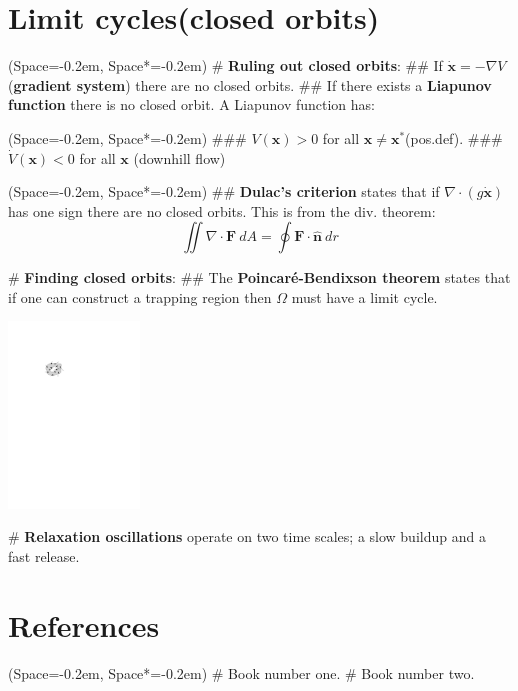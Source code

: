 \documentclass[11pt, a4paper]{article}
\newcommand{\listSpace}{-0.2em}%
\begin{document}
\begin{multicols}{2}
\section*{Limit cycles(closed orbits)}
\begin{easylist}[itemize]
	\ListProperties(Space=\listSpace, Space*=\listSpace)
	# \textbf{Ruling out closed orbits}:
	## If $\dot{\mathbf{x}} = - \nabla V$ (\textbf{gradient system}) there are no closed orbits.
	## If there exists a \textbf{Liapunov function} there is no closed orbit.
	A Liapunov function has:
	\begin{easylist}[enumerate]
		\ListProperties(Space=\listSpace, Space*=\listSpace)
		### $V(\mathbf{x}) > 0$ for all $\mathbf{x} \neq \mathbf{x}^*$(pos.def).
		### $\dot{V}(\mathbf{x}) < 0$ for all $\mathbf{x}$ (downhill flow)
	\end{easylist}
\end{easylist}
\begin{easylist}[itemize]
	\ListProperties(Space=\listSpace, Space*=\listSpace)
	## \textbf{Dulac's criterion} states that if $\nabla \cdot \left(g \dot{\mathbf{x}}\right)$
	has one sign there are no closed orbits. This is from the div. theorem:
	\begin{equation*}
		\iint \nabla \cdot \mathbf{F} \ dA = \oint \mathbf{F} \cdot\hat{\mathbf{n}} \ dr
	\end{equation*}
	
	# \textbf{Finding closed orbits}:
	## The \textbf{Poincaré-Bendixson theorem} states that if one can construct a trapping
	region then $\Omega$ must have a limit cycle.
	\begin{center}
		\includegraphics[width=3.5cm]{figs/trapping}
	\end{center}

	# \textbf{Relaxation oscillations} operate on two time scales; a slow buildup and a fast release.
	

\end{easylist}



\section*{References}
\small
\begin{easylist}[itemize]
	\ListProperties(Space=\listSpace, Space*=\listSpace)
	# Book number one.
	# Book number two.
\end{easylist}
\end{multicols}
\end{document}

